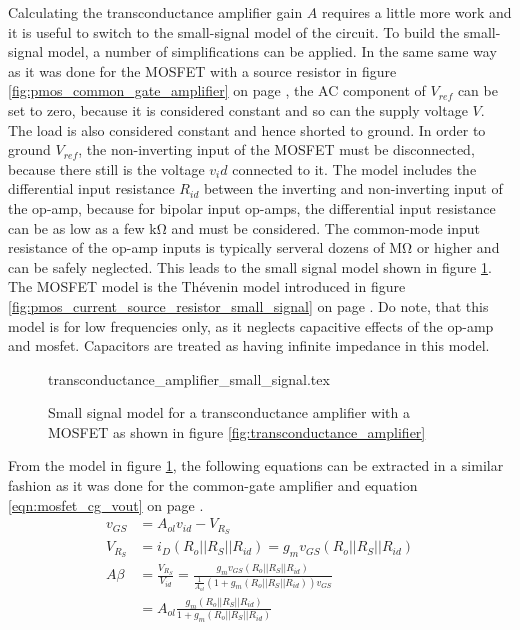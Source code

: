 \documentclass[12pt]{book}
\begin{document}
Calculating the transconductance amplifier gain $A$ requires a little more work and it is useful to switch to the small-signal model of the circuit. To build the small-signal model, a number of simplifications can be applied. In the same same way as it was done for the MOSFET with a source resistor in figure \ref{fig:pmos_common_gate_amplifier} on page \pageref{fig:pmos_common_gate_amplifier}, the AC component of $V_{ref}$ can be set to zero, because it is considered constant and so can the supply voltage $V$. The load is also considered constant and hence shorted to ground. In order to ground $V_{ref}$, the non-inverting input of the MOSFET must be disconnected, because there still is the voltage $v_id$ connected to it. The model includes the differential input resistance $R_{id}$ between the inverting and non-inverting input of the op-amp, because for bipolar input op-amps, the differential input resistance can be as low as a few \unit{\kilo\ohm} and must be considered. The common-mode input resistance of the op-amp inputs is typically serveral dozens of \unit{\mega \ohm} or higher and can be safely neglected. This leads to the small signal model shown in figure \ref{fig:transconductance_amplifier_small_signal}. The MOSFET model is the Thévenin model introduced in figure \ref{fig:pmos_current_source_resistor_small_signal} on page \pageref{fig:pmos_current_source_resistor_small_signal}. Do note, that this model is for low frequencies only, as it neglects capacitive effects of the op-amp and mosfet. Capacitors are treated as having infinite impedance in this model.

\begin{figure}[hb]
    \centering
        {transconductance_amplifier_small_signal.tex}
    \caption{Small signal model for a transconductance amplifier with a MOSFET as shown in figure \ref{fig:transconductance_amplifier}}
    \label{fig:transconductance_amplifier_small_signal}
\end{figure}

From the model in figure \ref{fig:transconductance_amplifier_small_signal}, the following equations can be extracted in a similar fashion as it was done for the common-gate amplifier and equation \ref{eqn:mosfet_cg_vout} on page \pageref{eqn:mosfet_cg_vout}.
\begin{align}
    v_{GS} &= A_{ol} v_{id} - V_{R_S}\\
    V_{R_S} &= i_D \left(R_o || R_S || R_{id}\right) = g_m v_{GS} \left(R_o || R_S || R_{id}\right)\\
    A\beta &= \frac{V_{R_S}}{V_{id}} = \frac{g_m v_{GS} \left(R_o || R_S || R_{id}\right)}{\frac{1}{A_{ol}} \left(1 + g_m \left(R_o || R_S || R_{id}\right)\right) v_{GS}} \nonumber\\
    &= A_{ol} \frac{g_m \left(R_o || R_S || R_{id}\right)}{1 + g_m \left(R_o || R_S || R_{id}\right)}
\end{align}
\end{document}
